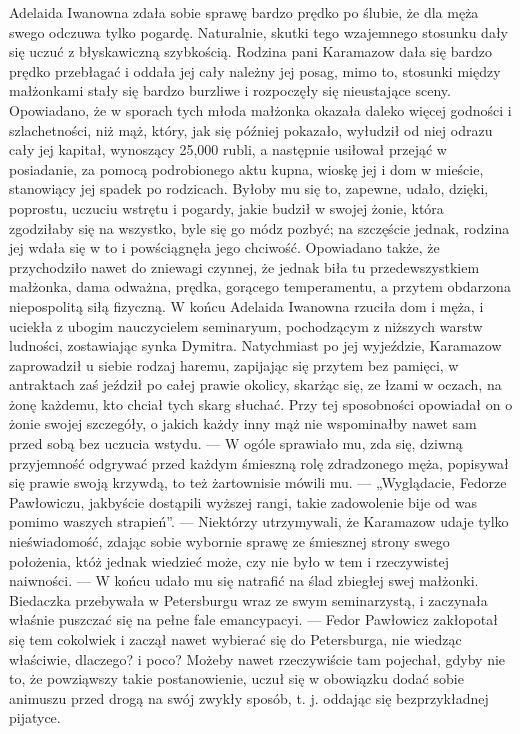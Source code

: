 \documentclass{article}
\begin{document}
Adelaida Iwanowna zdała sobie sprawę bardzo prędko po ślubie, że dla męża swego odczuwa tylko pogardę. Naturalnie, skutki tego wzajemnego stosunku dały się uczuć z błyskawiczną szybkością. Rodzina pani Karamazow dała się bardzo prędko przebłagać i oddała jej cały należny jej posag, mimo to, stosunki między małżonkami stały się bardzo burzliwe i rozpoczęły się nieustające sceny. Opowiadano, że w sporach tych młoda małżonka okazała daleko więcej godności i szlachetności, niż mąż, który, jak się później pokazało, wyłudził od niej odrazu cały jej kapitał, wynoszący 25,000 rubli, a następnie usiłował przejąć w posiadanie, za pomocą podrobionego aktu kupna, wioskę jej i dom w mieście, stanowiący jej spadek po rodzicach. Byłoby mu się to, zapewne, udało, dzięki, poprostu, uczuciu wstrętu i pogardy, jakie budził w swojej żonie, która zgodziłaby się na wszystko, byle się go módz pozbyć; na szczęście jednak, rodzina jej wdała się w to i powściągnęła jego chciwość. Opowiadano także, że przychodziło nawet do zniewagi czynnej, że jednak biła tu przedewszystkiem małżonka, dama odważna, prędka, gorącego temperamentu, a przytem obdarzona niepospolitą siłą fizyczną. W końcu Adelaida Iwanowna rzuciła dom i męża, i uciekła z ubogim nauczycielem seminaryum, pochodzącym z niższych warstw ludności, zostawiając synka Dymitra.
Natychmiast po jej wyjeździe, Karamazow zaprowadził u siebie rodzaj haremu, zapijając się przytem bez pamięci, w antraktach zaś jeździł po całej prawie okolicy, skarżąc się, ze łzami w oczach, na żonę każdemu, kto chciał tych skarg słuchać.
Przy tej sposobności opowiadał on o żonie swojej szczegóły, o jakich każdy inny mąż nie wspominałby nawet sam przed sobą bez uczucia wstydu. — W ogóle sprawiało mu, zda się, dziwną przyjemność odgrywać przed każdym śmieszną rolę zdradzonego męża, popisywał się prawie swoją krzywdą, to też żartownisie mówili mu. — „Wyglądacie, Fedorze Pawłowiczu, jakbyście dostąpili wyższej rangi, takie zadowolenie bije od was pomimo waszych strapień”. — Niektórzy utrzymywali, że Karamazow udaje tylko nieświadomość, zdając sobie wybornie sprawę ze śmiesznej strony swego położenia, któż jednak wiedzieć może, czy nie było w tem i rzeczywistej naiwności. — W końcu udało mu się natrafić na ślad zbiegłej swej małżonki. Biedaczka przebywała w Petersburgu wraz ze swym seminarzystą, i zaczynała właśnie puszczać się na pełne fale emancypacyi. — Fedor Pawłowicz zakłopotał się tem cokolwiek i zaczął nawet wybierać się do Petersburga, nie wiedząc właściwie, dlaczego? i poco? Możeby nawet rzeczywiście tam pojechał, gdyby nie to, że powziąwszy takie postanowienie, uczuł się w obowiązku dodać sobie animuszu przed drogą na swój zwykły sposób, t. j. oddając się bezprzykładnej pijatyce.
\end{document}
